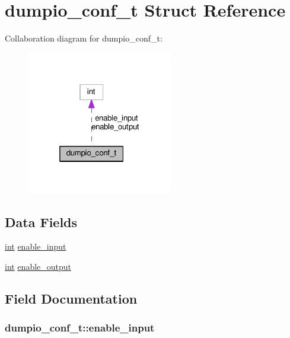 \hypertarget{structdumpio__conf__t}{}\section{dumpio\+\_\+conf\+\_\+t Struct Reference}
\label{structdumpio__conf__t}


Collaboration diagram for dumpio\+\_\+conf\+\_\+t\+:
\nopagebreak
\begin{figure}[H]
\begin{center}
\leavevmode
\includegraphics[width=181pt]{structdumpio__conf__t__coll__graph}
\end{center}
\end{figure}
\subsection*{Data Fields}
\begin{DoxyCompactItemize}
\item 
\hyperlink{pcre_8txt_a42dfa4ff673c82d8efe7144098fbc198}{int} \hyperlink{structdumpio__conf__t_a2268fe3202a145f59e4a47a03f9df00d}{enable\+\_\+input}
\item 
\hyperlink{pcre_8txt_a42dfa4ff673c82d8efe7144098fbc198}{int} \hyperlink{structdumpio__conf__t_aadc464945664855d396b4b2629ab23cc}{enable\+\_\+output}
\end{DoxyCompactItemize}


\subsection{Field Documentation}
\subsubsection[{\texorpdfstring{enable\+\_\+input}{enable_input}}]{ dumpio\+\_\+conf\+\_\+t\+::enable\+\_\+input}\hypertarget{structdumpio__conf__t_a2268fe3202a145f59e4a47a03f9df00d}{}\label{structdumpio__conf__t_a2268fe3202a145f59e4a47a03f9df00d}

